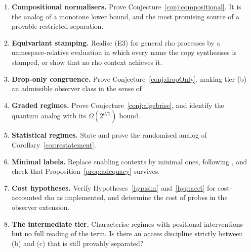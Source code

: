 \documentclass[11pt]{article}
\theoremstyle{definition}
\theoremstyle{plain}
\theoremstyle{remark}
\begin{document}
\begin{enumerate}[label=\arabic*.,leftmargin=2.2em]
\item \textbf{Compositional normalisers.} Prove
Conjecture~\ref{conj:compositional}. It is the analog of a monotone
lower bound, and the most promising source of a provable restricted
separation.

\item \textbf{Equivariant stamping.} Realise (E3) for general rho
processes by a namespace-relative evaluation in which every name the copy
synthesises is stamped, or show that no rho context achieves it.

\item \textbf{Drop-only congruence.} Prove
Conjecture~\ref{conj:dropOnly}, making tier (b) an admissible observer
class in the sense of \cite{BIHOL}.

\item \textbf{Graded regimes.} Prove Conjecture~\ref{conj:algebrise}, and
identify the quantum analog with its $\Omega(2^{d/2})$ bound.

\item \textbf{Statistical regimes.} State and prove the randomised
analog of Corollary~\ref{cor:restatement}.

\item \textbf{Minimal labels.} Replace enabling contexts by minimal ones,
following \cite{LeiferMilner00,BIHOL}, and check that
Proposition~\ref{prop:adequacy} survives.

\item \textbf{Cost hypotheses.} Verify Hypotheses~\ref{hyp:sim}
and~\ref{hyp:acct} for cost-accounted rho as implemented, and determine
the cost of probes in the observer extension.

\item \textbf{The intermediate tier.} Characterise regimes with
positional interventions but no full reading of the term. Is there an
access discipline strictly between (b) and (c) that is still provably
separated?
\end{enumerate}
\end{document}
